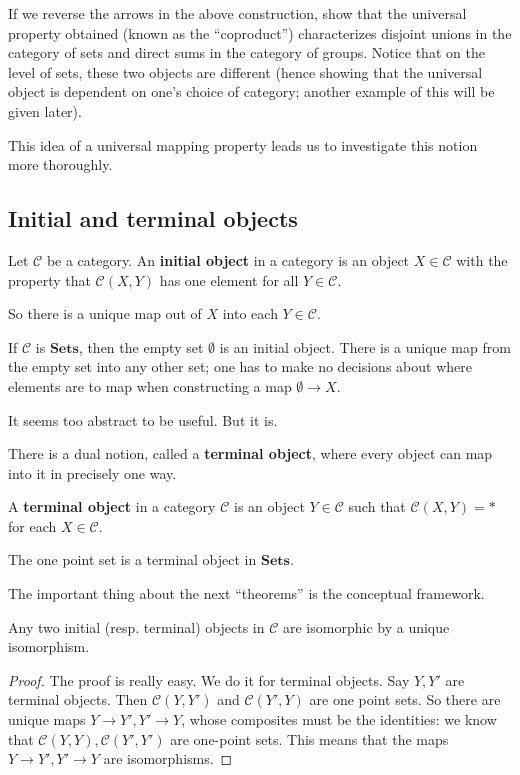 \begin{exercise} If we reverse the arrows in the above construction, show that
the universal property obtained (known as the ``coproduct'') characterizes
disjoint unions in the category of sets and direct sums in the category of
groups. Notice that on the level of sets, these two objects are different
(hence showing that the universal object is dependent on one's choice of
category;
another example of this will be given later). \end{exercise}
This idea of a universal mapping property leads us to investigate this notion
more thoroughly.


\subsection{Initial and terminal objects}

\begin{definition}
Let $\mathcal{C}$ be a category. An \textbf{initial object} in a category is an
object $X \in \mathcal{C}$ with the property that $\mathcal{C}(X, Y)$ has one
element for all $Y \in \mathcal{C}$.

So there is a unique map out of $X$ into each $Y \in \mathcal{C}$.
\end{definition}


\begin{example}
If $\mathcal{C}$ is $\mathbf{Sets}$, then the empty set $\emptyset$ is an
initial object. There is a unique map from the empty set into any other set;
one has to make no decisions about where elements are to map when
constructing a map $\emptyset \to X$.
\end{example}

It seems too abstract to be useful. But it is.

There is a dual notion, called a \textbf{terminal object}, where every object
can map into it in precisely one way.
\begin{definition}
A \textbf{terminal object} in a category $\mathcal{C}$ is an object $Y \in
\mathcal{C}$ such that $\mathcal{C}(X, Y) = \ast$ for each $X \in \mathcal{C}$.
\end{definition}

\begin{example}
The one point set is a terminal object in $\mathbf{Sets}$.
\end{example}

The important thing about the next ``theorems'' is the conceptual framework.
\begin{theorem}
Any two initial (resp. terminal) objects in $\mathcal{C}$ are isomorphic by a
unique isomorphism.
\end{theorem}
\begin{proof}
The proof is really easy. We do it for terminal objects. Say $Y, Y'$ are
terminal objects. Then $\mathcal{C}(Y, Y')$ and $\mathcal{C}(Y', Y)$ are one
point sets. So there are unique maps $Y \to Y', Y' \to Y$, whose composites
must be the identities: we know that $\mathcal{C}(Y, Y) , \mathcal{C}(Y', Y')$
are one-point sets. This means that the maps $Y \to Y', Y' \to Y$ are
isomorphisms.
\end{proof}

